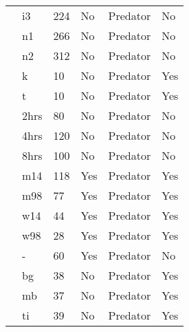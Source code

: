 \begin{longtable}{llllll}
\citet{Uttley:1980aa}&i3&224&No&Predator&No\tabularnewline
\citet{Uttley:1980aa}&n1&266&No&Predator&No\tabularnewline
\citet{Uttley:1980aa}&n2&312&No&Predator&No\tabularnewline
\citet{Vahl:2005aa}&k&10&No&Predator&Yes\tabularnewline
\citet{Vahl:2005aa}&t&10&No&Predator&Yes\tabularnewline
\citet{Von-Westernhagen:1976aa}&2hrs&80&No&Predator&No\tabularnewline
\citet{Von-Westernhagen:1976aa}&4hrs&120&No&Predator&No\tabularnewline
\citet{Von-Westernhagen:1976aa}&8hrs&100&No&Predator&No\tabularnewline
\citet{Vucetich:2002aa}&m14&118&Yes&Predator&Yes\tabularnewline
\citet{Vucetich:2002aa}&m98&77&Yes&Predator&Yes\tabularnewline
\citet{Vucetich:2002aa}&w14&44&Yes&Predator&Yes\tabularnewline
\citet{Vucetich:2002aa}&w98&28&Yes&Predator&Yes\tabularnewline
\citet{Walde:1984aa}&-&60&Yes&Predator&No\tabularnewline
\citet{Wasserman:2016aa}&bg&38&No&Predator&Yes\tabularnewline
\citet{Wasserman:2016aa}&mb&37&No&Predator&Yes\tabularnewline
\newpage
\citet{Wasserman:2016aa}&ti&39&No&Predator&Yes\tabularnewline
\hline
\end{longtable}
